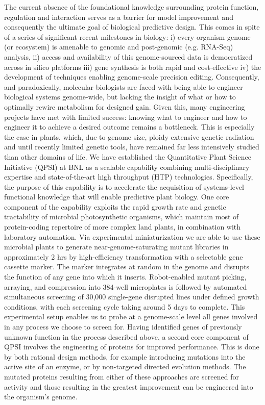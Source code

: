 \documentclass[11pt]{article}
\begin{document}
The current absence of the foundational knowledge surrounding protein function, regulation and interaction serves as a barrier for model improvement and consequently the ultimate goal of biological predictive design. This comes in spite of a series of significant recent milestones in biology: i) every organism genome (or ecosystem) is amenable to genomic and post-genomic (e.g. RNA-Seq) analysis, ii) access and availability of this genome-sourced data is democratized across in silico platforms iii) gene synthesis is both rapid and cost-effective iv) the development of techniques enabling genome-scale precision editing. Consequently, and paradoxically, molecular biologists are faced with being able to engineer biological systems genome-wide, but lacking the insight of what or how to optimally rewire metabolism for designed gain. Given this, many engineering projects have met with limited success: knowing what to engineer and how to engineer it to achieve a desired outcome remains a bottleneck. This is especially the case in plants, which, due to genome size, ploidy extensive genetic radiation and until recently limited genetic tools, have remained far less intensively studied than other domains of life.
We have established the Quantitative Plant Science Initiative (QPSI) at BNL as a scalable capability combining multi-disciplinary expertise and state-of-the-art high throughput (HTP) technologies. Specifically, the purpose of this capability is to accelerate the acquisition of systems-level functional knowledge that will enable predictive plant biology. One core component of the capability exploits the rapid growth rate and genetic tractability of microbial photosynthetic organisms, which maintain most of protein-coding repertoire of more complex land plants, in combination with laboratory automation. Via experimental miniaturization we are able to use these microbial plants to generate near-genome-saturating mutant libraries in approximately 2 hrs by high-efficiency transformation with a selectable gene cassette marker. The marker integrates at random in the genome and disrupts the function of any gene into which it inserts. Robot-enabled mutant picking, arraying, and compression into 384-well microplates is followed by automated simultaneous screening of 30,000 single-gene disrupted lines under defined growth conditions, with each screening cycle taking around 5 days to complete. This experimental setup enables us to probe at a genome-scale level all genes involved in any process we choose to screen for.
Having identified genes of previously unknown function in the process described above, a second core component of QPSI involves the engineering of proteins for improved performance. This is done by both rational design methods, for example introducing mutations into the active site of an enzyme, or by non-targeted directed evolution methods. The mutated proteins resulting from either of these approaches are screened for activity and those resulting in the greatest improvement can be engineered into the organism’s genome.
\end{document}
